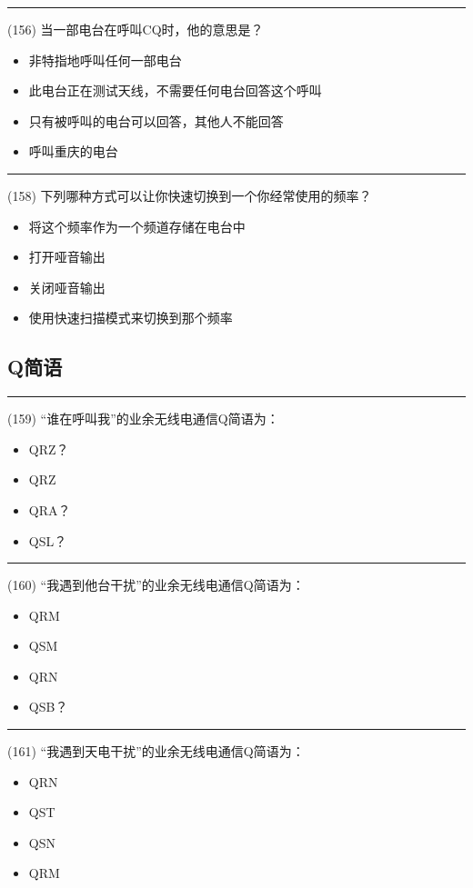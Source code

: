 \documentclass[twocolumn,hyperref,UTF8]{ctexart}  %
\begin{document}
\noindent\rule{0.5\textwidth}{1pt}
\heiti (156) 当一部电台在呼叫CQ时，他的意思是？ \songti {\color{gray} [LK1098] }
\begin{itemize}
	\item  非特指地呼叫任何一部电台
	\item  此电台正在测试天线，不需要任何电台回答这个呼叫
	\item  只有被呼叫的电台可以回答，其他人不能回答
	\item  呼叫重庆的电台
\end{itemize}


\noindent\rule{0.5\textwidth}{1pt}
\heiti (158) 下列哪种方式可以让你快速切换到一个你经常使用的频率？ \songti {\color{gray} [LK1131] }
\begin{itemize}
	\item  将这个频率作为一个频道存储在电台中
	\item  打开哑音输出
	\item  关闭哑音输出
	\item  使用快速扫描模式来切换到那个频率
\end{itemize}


\clearpage
\subsection{Q简语}


\noindent\rule{0.5\textwidth}{1pt}
\heiti (159) “谁在呼叫我”的业余无线电通信Q简语为： \songti {\color{gray} [LK0287] }
\begin{itemize}
	\item  QRZ？
	\item  QRZ
	\item  QRA？
	\item  QSL？
\end{itemize}


\noindent\rule{0.5\textwidth}{1pt}
\heiti (160) “我遇到他台干扰”的业余无线电通信Q简语为： \songti {\color{gray} [LK0292] }
\begin{itemize}
	\item  QRM
	\item  QSM
	\item  QRN
	\item  QSB？
\end{itemize}


\noindent\rule{0.5\textwidth}{1pt}
\heiti (161) “我遇到天电干扰”的业余无线电通信Q简语为： \songti {\color{gray} [LK0294] }
\begin{itemize}
	\item  QRN
	\item  QST
	\item  QSN
	\item  QRM
\end{itemize}
\end{document}
